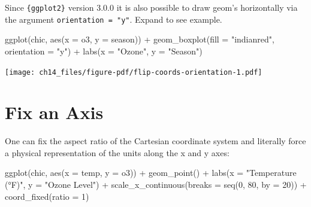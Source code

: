 \documentclass[
  letterpaper,
]{scrbook}
\newenvironment{Shaded}{\begin{snugshade}}{\end{snugshade}}
\newcommand{\AttributeTok}[1]{\textcolor[rgb]{0.40,0.45,0.13}{#1}}
\newcommand{\DecValTok}[1]{\textcolor[rgb]{0.68,0.00,0.00}{#1}}
\newcommand{\FunctionTok}[1]{\textcolor[rgb]{0.28,0.35,0.67}{#1}}
\newcommand{\NormalTok}[1]{\textcolor[rgb]{0.00,0.23,0.31}{#1}}
\newcommand{\SpecialCharTok}[1]{\textcolor[rgb]{0.37,0.37,0.37}{#1}}
\newcommand{\StringTok}[1]{\textcolor[rgb]{0.13,0.47,0.30}{#1}}
\begin{document}
\begin{tcolorbox}[enhanced jigsaw, toprule=.15mm, bottomtitle=1mm, coltitle=black, breakable, colbacktitle=quarto-callout-note-color!10!white, opacityback=0, toptitle=1mm, colframe=quarto-callout-note-color-frame, titlerule=0mm, title=\textcolor{quarto-callout-note-color}{\faInfo}\hspace{0.5em}{Using \texttt{orientation\ =\ "y"}}, bottomrule=.15mm, arc=.35mm, opacitybacktitle=0.6, leftrule=.75mm, left=2mm, rightrule=.15mm, colback=white]

Since \texttt{\{ggplot2\}} version 3.0.0 it is also possible to draw
geom's horizontally via the argument \texttt{orientation\ =\ "y"}.
Expand to see example.

\begin{Shaded}
\begin{Highlighting}[]
\FunctionTok{ggplot}\NormalTok{(chic, }\FunctionTok{aes}\NormalTok{(}\AttributeTok{x =}\NormalTok{ o3, }\AttributeTok{y =}\NormalTok{ season)) }\SpecialCharTok{+}
  \FunctionTok{geom\_boxplot}\NormalTok{(}\AttributeTok{fill =} \StringTok{"indianred"}\NormalTok{, }\AttributeTok{orientation =} \StringTok{"y"}\NormalTok{) }\SpecialCharTok{+}
  \FunctionTok{labs}\NormalTok{(}\AttributeTok{x =} \StringTok{"Ozone"}\NormalTok{, }\AttributeTok{y =} \StringTok{"Season"}\NormalTok{)}
\end{Highlighting}
\end{Shaded}

\texttt{[image: ch14\_files/figure-pdf/flip-coords-orientation-1.pdf]}

\end{tcolorbox}

\section{Fix an Axis}\label{fix-an-axis}

One can fix the aspect ratio of the Cartesian coordinate system and
literally force a physical representation of the units along the x and y
axes:

\begin{Shaded}
\begin{Highlighting}[]
\FunctionTok{ggplot}\NormalTok{(chic, }\FunctionTok{aes}\NormalTok{(}\AttributeTok{x =}\NormalTok{ temp, }\AttributeTok{y =}\NormalTok{ o3)) }\SpecialCharTok{+}
  \FunctionTok{geom\_point}\NormalTok{() }\SpecialCharTok{+}
  \FunctionTok{labs}\NormalTok{(}\AttributeTok{x =} \StringTok{"Temperature (°F)"}\NormalTok{, }\AttributeTok{y =} \StringTok{"Ozone Level"}\NormalTok{) }\SpecialCharTok{+}
  \FunctionTok{scale\_x\_continuous}\NormalTok{(}\AttributeTok{breaks =} \FunctionTok{seq}\NormalTok{(}\DecValTok{0}\NormalTok{, }\DecValTok{80}\NormalTok{, }\AttributeTok{by =} \DecValTok{20}\NormalTok{)) }\SpecialCharTok{+}
  \FunctionTok{coord\_fixed}\NormalTok{(}\AttributeTok{ratio =} \DecValTok{1}\NormalTok{)}
\end{Highlighting}
\end{Shaded}
\end{document}
